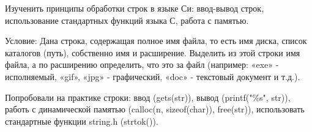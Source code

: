 \documentclass[12pt,a4paper]{article}
\begin{document}
\maketitle



\labheading



\begin{labgoal}
Изученить принципы обработки строк в языке Си: ввод-вывод строк, использование стандартных функций языка С, работа с памятью.
\end{labgoal}



\labreport

\begin{conductionA14}
Условие: Дана строка, содержащая полное имя файла, то есть имя диска, список
каталогов (путь), собственно имя и расширение. Выделить из этой строки имя
файла, а по расширению определить, что это за файл (например: «exe» -
исполняемый, «gif», «jpg» - графический, «doc» - текстовый документ и т.д.).
\end{conductionA14}





\begin{labconclusion}
Попробовали на практике строки: ввод (gets(str)), вывод (printf("\%s", str)), работь с динамической памятью (calloc(n, sizeof(char)), free(str)), использовать стандартные функции string.h (strtok()).
\end{labconclusion}
\end{document}

